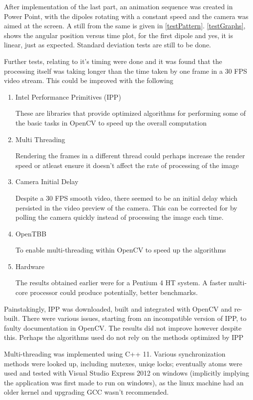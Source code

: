 			After implementation of the last part, an animation sequence was created in Power Point, with the dipoles rotating with a constant speed and the camera was aimed at the screen. A still from the same is given in \autoref{testPattern}. \autoref{testGraphs}, shows the angular position versus time plot, for the first dipole and yes, it is linear, just as expected. Standard deviation tests are still to be done.
			\par
			Further tests, relating to it's timing were done and it was found that the processing itself was taking longer than the time taken by one frame in a 30 FPS video stream. This could be improved with the following
			\begin{enumerate}
				\item Intel Performance Primitives (IPP)
					\par
					These are libraries that provide optimized algorithms for performing some of the basic tasks in OpenCV to speed up the overall computation
				\item Multi Threading
					\par
					Rendering the frames in a different thread could perhaps increase the render speed or atleast ensure it doesn't affect the rate of processing of the image
				\item Camera Initial Delay
					\par
					Despite a 30 FPS smooth video, there seemed to be an initial delay which persisted in the video preview of the camera. This can be corrected for by polling the camera quickly instead of processing the image each time.
				\item OpenTBB
					\par
					To enable multi-threading within OpenCV to speed up the algorithms
				\item Hardware
					\par
					The results obtained earlier were for a Pentium 4 HT system. A faster multi-core processor could produce potentially, better benchmarks.
			\end{enumerate}
			Painstakingly, IPP was downloaded, built and integrated with OpenCV and re-built. There were various issues, starting from an incompatible version of IPP, to faulty documentation in OpenCV. The results did not improve however despite this. Perhaps the algorithms used do not rely on the methods optimized by IPP
			\par
			Multi-threading was implemented using C++ 11. Various synchronization methods were looked up, including mutexes, uniqe locks; eventually atoms were used and tested with Visual Studio Express 2012 on windows (implicitly implying the application was first made to run on windows), as the linux machine had an older kernel and upgrading GCC wasn't recommended.
